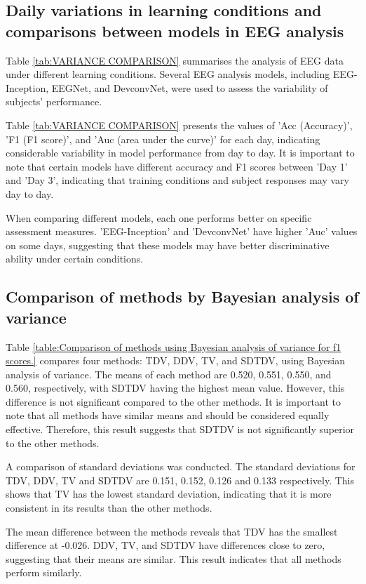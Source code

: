    \subsection{Daily variations in learning conditions and comparisons between models in EEG analysis }
    Table \ref{tab:VARIANCE COMPARISON} summarises the analysis of EEG data under different learning conditions. Several EEG analysis models, including EEG-Inception, EEGNet, and DevconvNet, were used to assess the variability of subjects' performance.

    Table \ref{tab:VARIANCE COMPARISON} presents the values of 'Acc (Accuracy)', 'F1 (F1 score)', and 'Auc (area under the curve)' for each day, indicating considerable variability in model performance from day to day. It is important to note that certain models have different accuracy and F1 scores between 'Day 1' and 'Day 3', indicating that training conditions and subject responses may vary day to day.
    
    When comparing different models, each one performs better on specific assessment measures. 'EEG-Inception' and 'DevconvNet' have higher 'Auc' values on some days, suggesting that these models may have better discriminative ability under certain conditions.
    
    
    \subsection{Comparison of methods by Bayesian analysis of variance}
    Table \ref{table:Comparison of methods using Bayesian analysis of variance for f1 scores.} compares four methods: TDV, DDV, TV, and SDTDV, using Bayesian analysis of variance. The means of each method are 0.520, 0.551, 0.550, and 0.560, respectively, with SDTDV having the highest mean value. However, this difference is not significant compared to the other methods. It is important to note that all methods have similar means and should be considered equally effective. Therefore, this result suggests that SDTDV is not significantly superior to the other methods.

    A comparison of standard deviations was conducted. The standard deviations for TDV, DDV, TV and SDTDV are 0.151, 0.152, 0.126 and 0.133 respectively. This shows that TV has the lowest standard deviation, indicating that it is more consistent in its results than the other methods.

    The mean difference between the methods reveals that TDV has the smallest difference at -0.026. DDV, TV, and SDTDV have differences close to zero, suggesting that their means are similar. This result indicates that all methods perform similarly.

